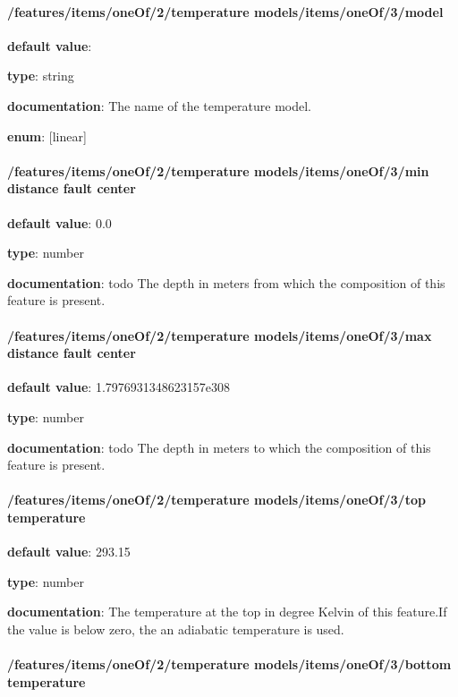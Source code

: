 \paragraph{/features/items/oneOf/2/temperature models/items/oneOf/3/model} \begin{itemized}
\item {\bf default value}: 
\item {\bf type}: string
\item {\bf documentation}: The name of the temperature model.
\item {\bf enum}: [linear]\end{itemized}\paragraph{/features/items/oneOf/2/temperature models/items/oneOf/3/min distance fault center} \begin{itemized}
\item {\bf default value}: 0.0
\item {\bf type}: number
\item {\bf documentation}: todo The depth in meters from which the composition of this feature is present.
\end{itemized}\paragraph{/features/items/oneOf/2/temperature models/items/oneOf/3/max distance fault center} \begin{itemized}
\item {\bf default value}: 1.7976931348623157e308
\item {\bf type}: number
\item {\bf documentation}: todo The depth in meters to which the composition of this feature is present.
\end{itemized}\paragraph{/features/items/oneOf/2/temperature models/items/oneOf/3/top temperature} \begin{itemized}
\item {\bf default value}: 293.15
\item {\bf type}: number
\item {\bf documentation}: The temperature at the top in degree Kelvin of this feature.If the value is below zero, the an adiabatic temperature is used.
\end{itemized}\paragraph{/features/items/oneOf/2/temperature models/items/oneOf/3/bottom temperature} \begin{itemized}

\end{itemized}

